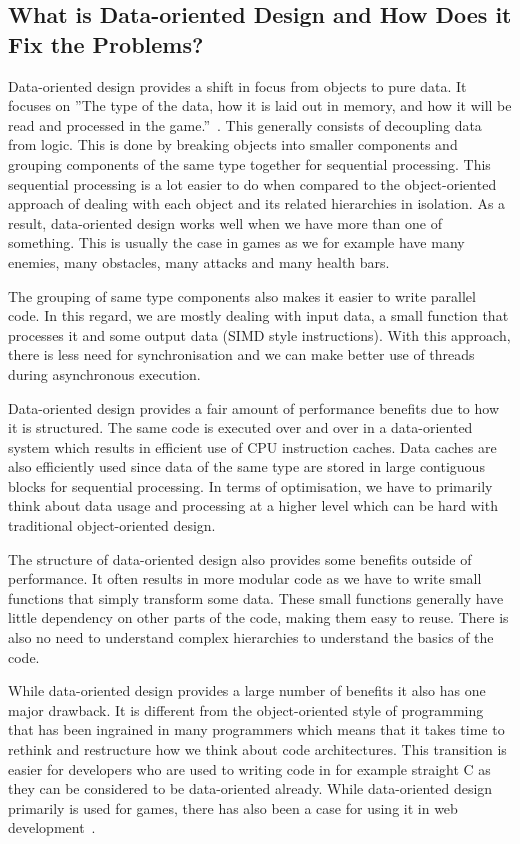\subsection{What is Data-oriented Design and How Does it Fix the Problems?} 
Data-oriented design provides a shift in focus from objects to pure data. It focuses on ''The type of the data, how it is laid out in memory, and how it will be read and processed in the game.''~\cite{noelDOD}. This generally consists of decoupling data from logic. This is done by breaking objects into smaller components and grouping components of the same type together for sequential processing. This sequential processing is a lot easier to do when compared to the object-oriented approach of dealing with each object and its related hierarchies in isolation. As a result, data-oriented design works well when we have more than one of something. This is usually the case in games as we for example have many enemies, many obstacles, many attacks and many health bars. 

The grouping of same type components also makes it easier to write parallel code. In this regard, we are mostly dealing with input data, a small function that processes it and some output data (SIMD style instructions). With this approach, there is less need for synchronisation and we can make better use of threads during asynchronous execution.

Data-oriented design provides a fair amount of performance benefits due to how it is structured. The same code is executed over and over in a data-oriented system which results in efficient use of CPU instruction caches. Data caches are also efficiently used since data of the same type are stored in large contiguous blocks for sequential processing. In terms of optimisation, we have to primarily think about data usage and processing at a higher level which can be hard with traditional object-oriented design. 

The structure of data-oriented design also provides some benefits outside of performance. It often results in more modular code as we have to write small functions that simply transform some data. These small functions generally have little dependency on other parts of the code, making them easy to reuse. There is also no need to understand complex hierarchies to understand the basics of the code. 

While data-oriented design provides a large number of benefits it also has one major drawback. It is different from the object-oriented style of programming that has been ingrained in many programmers which means that it takes time to rethink and restructure how we think about code architectures. This transition is easier for developers who are used to writing code in for example straight C as they can be considered to be data-oriented already. While data-oriented design primarily is used for games, there has also been a case for using it in web development~\cite{nikolovDOD}. 

